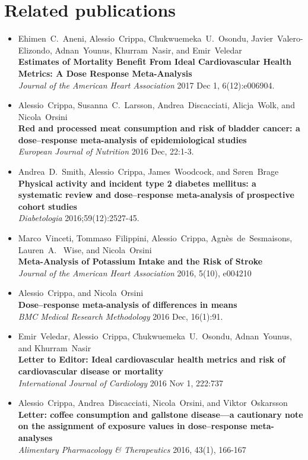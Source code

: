 \documentclass[11pt,a4paper,twoside,openany]{book}\usepackage{knitr}
\begin{document}
{{\chapter*{Related publications}
\begin{itemize}
\item Ehimen~C.~Aneni, Alessio~Crippa, Chukwuemeka~U.~Osondu, Javier~Valero-Elizondo, Adnan~Younus, Khurram~Nasir, and Emir~Veledar \\ \textbf{Estimates of Mortality Benefit From Ideal Cardiovascular Health Metrics: A Dose Response Meta-Analysis} \\ \textit{Journal of the American Heart Association} 2017 Dec 1, 6(12):e006904.
\item Alessio~Crippa, Susanna~C.~Larsson, Andrea~Discacciati, Alicja~Wolk, and Nicola~Orsini \\ \textbf{Red and processed meat consumption and risk of bladder cancer: a dose--response meta-analysis of epidemiological studies} \\ \textit{European Journal of Nutrition} 2016 Dec, 22:1-3.
\item Andrea~D.~Smith, Alessio~Crippa, James~Woodcock, and S{\o}ren~Brage \\ \textbf{Physical activity and incident type 2 diabetes mellitus: a systematic review and dose--response meta-analysis of prospective cohort studies} \\ \textit{Diabetologia} 2016;59(12):2527-45.
\item Marco~Vinceti, Tommaso~Filippini, Alessio~Crippa, Agn{\`e}s~de~Sesmaisons, Lauren~A.~ Wise, and Nicola~Orsini \\ \textbf{Meta-Analysis of Potassium Intake and the Risk of Stroke} \\ \textit{Journal of the American Heart Association} 2016, 5(10), e004210
\item Alessio~Crippa, and Nicola~Orsini \\ \textbf{Dose--response meta-analysis of differences in means} \\ \textit{BMC Medical Research Methodology} 2016 Dec, 16(1):91.
\item Emir~Veledar, Alessio~Crippa, Chukwuemeka~U.~Osondu, Adnan~Younus, and Khurram~Nasir \\ \textbf{Letter to Editor: Ideal cardiovascular health metrics and risk of cardiovascular disease or mortality} \\ \textit{International Journal of Cardiology} 2016 Nov 1, 222:737
\item Alessio~Crippa, Andrea~Discacciati, Nicola~Orsini, and Viktor~Oskarsson \\ \textbf{Letter: coffee consumption and gallstone disease---a cautionary note on the assignment of exposure values in dose--response meta-analyses} \\ \textit{Alimentary Pharmacology \& Therapeutics} 2016, 43(1), 166-167

\end{itemize}}}
\end{document}
